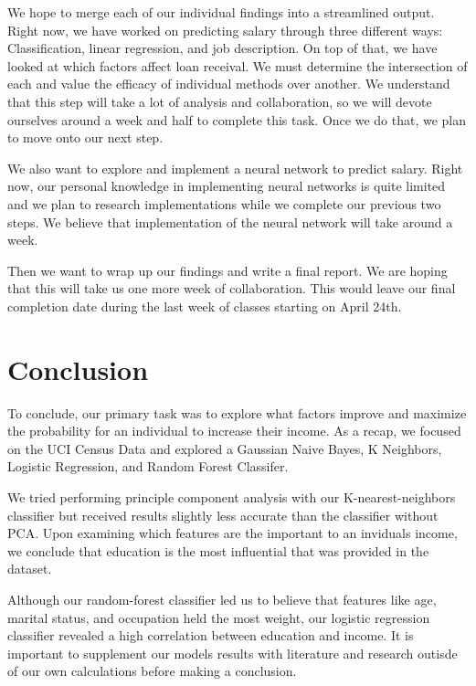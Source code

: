\documentclass{article}
\begin{document}
We hope to merge each of our individual findings into a streamlined output. Right now, we have worked on predicting salary through three different ways: Classification, linear regression, and job description. On top of that, we have looked at which factors affect loan receival. We must determine the intersection of each and value the efficacy of individual methods over another. We understand that this step will take a lot of analysis and collaboration, so we will devote ourselves around a week and half to complete this task. Once we do that, we plan to move onto our next step. 

We also want to explore and implement a neural network to predict salary. Right now, our personal knowledge in implementing neural networks is quite limited and we plan to research implementations while we complete our previous two steps. We believe that implementation of the neural network will take around a week. 

Then we want to wrap up our findings and write a final report. We are hoping that this will take us one more week of collaboration. This would leave our final completion date during the last week of classes starting on April 24th. 

\section{Conclusion}

To conclude, our primary task was to explore what factors improve and maximize the probability for an individual to increase their income. As a recap, we focused on the UCI Census Data and explored a Gaussian Naive Bayes, K Neighbors, Logistic Regression, and Random Forest Classifer. 

We tried performing principle component analysis with our K-nearest-neighbors classifier but received results slightly less accurate than the classifier without PCA. Upon examining which features are the important to an inviduals income, we conclude that education is the most influential that was provided in the dataset.

Although our random-forest classifier led us to believe that features like age, marital status, and occupation held the most weight, our logistic regression classifier revealed a high correlation between education and income. It is important to supplement our models results with literature and research outisde of our own calculations before making a conclusion.





\end{document}
